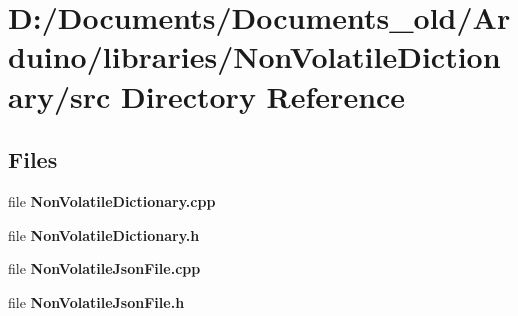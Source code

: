 \section{D\+:/\+Documents/\+Documents\+\_\+old/\+Arduino/libraries/\+Non\+Volatile\+Dictionary/src Directory Reference}
\label{dir_175ed696dd59f7ad18b1603c38618cb4}
\subsection*{Files}
\begin{DoxyCompactItemize}
\item 
file \textbf{ Non\+Volatile\+Dictionary.\+cpp}
\item 
file \textbf{ Non\+Volatile\+Dictionary.\+h}
\item 
file \textbf{ Non\+Volatile\+Json\+File.\+cpp}
\item 
file \textbf{ Non\+Volatile\+Json\+File.\+h}
\end{DoxyCompactItemize}

